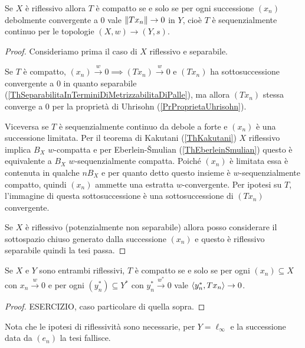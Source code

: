 \begin{proposition}\label{PrOperatoreCompattoDominioRiflessivo}
Se $X$ \`e riflessivo allora $T$ \`e compatto se e solo se per ogni successione $(x_n)$ debolmente convergente a $0$ vale $\left\Vert{Tx_n}\right\Vert\to 0$ in $Y$, cio\`e $T$ \`e sequenzialmente continuo per le topologie $(X,w)\to (Y,s)$.
\end{proposition}
\begin{proof}
Consideriamo prima il caso di $X$ riflessivo e separabile. 

Se $T$ \`e compatto, $(x_n)\xrightarrow{w}0\implies (Tx_n)\xrightarrow{w}0$ e $(Tx_n)$ ha sottosuccessione convergente a $0$ in quanto separabile (\ref{ThSeparabilitaInTerminiDiMetrizzabilitaDiPalle}), ma allora $(Tx_n)$ stessa converge a $0$ per la propriet\`a di Uhrisohn (\ref{PrProprietaUhrisohn}).

Viceversa se $T$ \`e sequenzialmente continuo da debole a forte e $(x_n)$ \`e una successione limitata. Per il teorema di Kakutani (\ref{ThKakutani}) $X$ riflessivo implica $B_X$ $w$-compatta e per Eberlein-\v Smulian (\ref{ThEberleinSmulian}) questo \`e equivalente a $B_X$ $w$-sequenzialmente compatta. Poich\'e $(x_n)$ \`e limitata essa \`e contenuta in qualche $nB_X$ e per quanto detto questo insieme \`e $w$-sequenzialmente compatto, quindi $(x_n)$ ammette una estratta $w$-convergente. Per ipotesi su $T$, l'immagine di questa sottosuccessione \`e una sottosuccessione di $(Tx_n)$ convergente.

\medskip

Se $X$ \`e riflessivo (potenzialmente non separabile) allora posso considerare il sottospazio chiuso generato dalla successione $(x_n)$ e questo \`e riflessivo separabile quindi la tesi passa.
\end{proof}


\begin{exercise}
Se $X$ e $Y$ sono entrambi riflessivi, $T$ \`e compatto se e solo se per ogni $(x_n)\subseteq X$ con $x_n\xrightarrow{w}0$ e per ogni $(y_n^\ast)\subseteq Y^\ast$ con $y_n^\ast\xrightarrow{w^\ast}0$ vale $\left\langle {y_n^\ast,T x_n}\right\rangle\to 0$.
\end{exercise}
\begin{proof}
ESERCIZIO, caso particolare di quella sopra.
\end{proof}

\begin{remark}
Nota che le ipotesi di riflessivit\`a sono necessarie, per $Y=\ell_\infty$ e la successione data da $(e_n)$ la tesi fallisce.
\end{remark}


